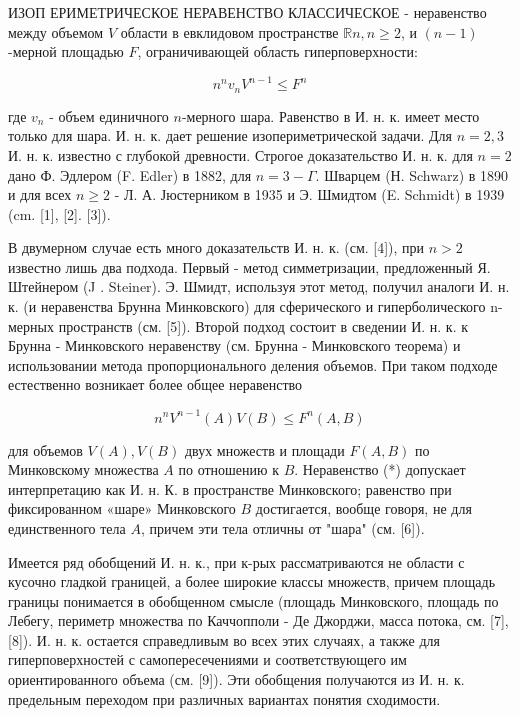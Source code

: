 \documentclass[10pt]{article}
\begin{document}
ИЗОП ЕРИМЕТРИЧЕСКОЕ НЕРАВЕНСТВО КЛАССИЧЕСКОЕ - неравенство между объемом $V$ области в евклидовом пространстве $\mathbb{R} n, n \geqslant 2$, и $(n-1)$-мерной площадью $F$, ограничивающей область гиперповерхности:



\[

n^{n} v_{n} V^{n-1} \leqslant F^{n}

\]



где $v_{n}$ - объем единичного $n$-мерного шара. Равенство в И. н. к. имеет место только для шара. И. н. к. дает решение изопериметрической задачи. Для $n=2,3$ И. н. к. известно с глубокой древности. Строгое доказательство И. н. к. для $n=2$ дано Ф. Эдлером (F. Edler) в 1882, для $n=3-\Gamma$. Шварцем (Н. Schwarz) в 1890 и для всех $n \geqslant 2$ - Л. А. Јюстерником в 1935 и Э. Шмидтом (E. Schmidt) в 1939 (cm. [1], [2]. [3]).



В двумерном случае есть много доказательств И. н. к. (см. [4]), при $n>2$ известно лишь два подхода. Первый - метод симметризации, предложенный Я. Штейнером (J . Steiner). Э. Шмидт, используя этот метод, получил аналоги И. н. к. (и неравенства Брунна Минковского) для сферического и гиперболического n-мерных пространств (см. [5]). Второй подход состоит в сведении И. н. к. к Брунна - Минковского неравенству (см. Брунна - Минковского теорема) и использовании метода пропорционального деления объемов. При таком подходе естественно возникает более общее неравенство



\[

n^{n} V^{n-1}(A) V(B) \leqslant F^{n}(A, B)

\]



для объемов $V(A), V(B)$ двух множеств и площади $F(A, B)$ по Минковскому множества $A$ по отношению к $B$. Неравенство (*) допускает интерпретацию как И. н. К. в пространстве Минковского; равенство при фиксированном «шаре» Минковского $B$ достигается, вообще говоря, не для единственного тела $A$, причем эти тела отличны от "шара" (см. [6]).



Имеется ряд обобщений И. н. к., при к-рых рассматриваются не области с кусочно гладкой границей, а более широкие классы множеств, причем площадь границы понимается в обобщенном смысле (площадь Минковского, площадь по Лебегу, периметр множества по Каччопполи - Де Джорджи, масса потока, см. [7], [8]). И. н. к. остается справедливым во всех этих случаях, а также для гиперповерхностей с самопересечениями и соответствующего им ориентированного объема (см. [9]). Эти обобщения получаются из И. н. к. предельным переходом при различных вариантах понятия сходимости.
\end{document}
